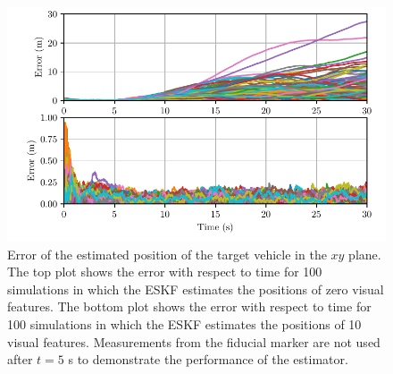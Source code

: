 \begin{figure}
  \centering
  \includegraphics[width=5.5in]{plots/mc_both_xy_err}
  \caption[Estimated Error for 100 Simulations]{Error of the estimated position of the target vehicle in the $xy$
    plane. The top plot shows the error with respect to time for 100 simulations in which the ESKF
    estimates the positions of zero visual features. The bottom plot shows the
    error with respect to time for 100 simulations in which the ESKF estimates the positions of 10
    visual features.
    Measurements from the fiducial marker are not used after $t = 5$ s to
    demonstrate the performance of the estimator.
}
  \label{fig:mc_xy_err}
\end{figure}


